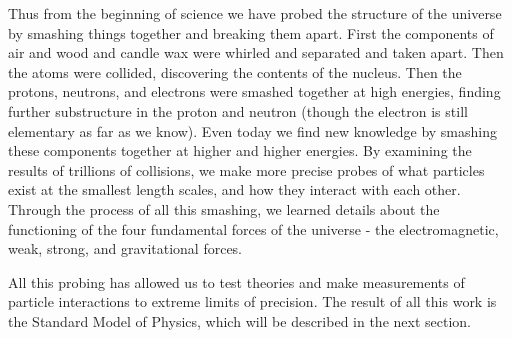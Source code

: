 Thus from the beginning of science we have probed the structure of the universe by smashing things together and breaking them apart. First the components of air and wood and candle wax were whirled and separated and taken apart. Then the atoms were collided, discovering the contents of the nucleus. Then the protons, neutrons, and electrons were smashed together at high energies, finding further substructure in the proton and neutron (though the electron is still elementary as far as we know). Even today we find new knowledge by smashing these components together at higher and higher energies. By examining the results of trillions of collisions, we make more precise probes of what particles exist at the smallest length scales, and how they interact with each other. Through the process of all this smashing, we learned details about the functioning of the four fundamental forces of the universe - the electromagnetic, weak, strong, and gravitational forces.

All this probing has allowed us to test theories and make measurements of particle interactions to extreme limits of precision. The result of all this work is the Standard Model of Physics, which will be described in the next section.
